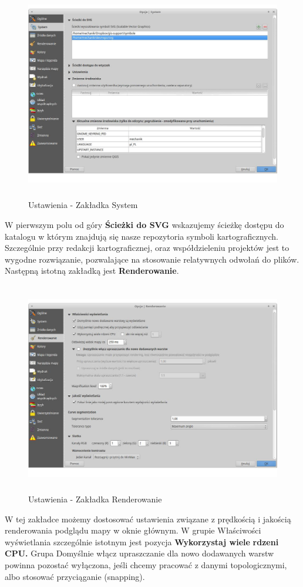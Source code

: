 \documentclass[12pt,a4paper]{book}
\begin{document}
\begin{center}
\begin{figure}
\includegraphics[width=13.014cm,height=9.282cm]{002-zakladka-system.png}
\caption{Ustawienia - Zakładka System}
\end{figure}
\end{center}
W pierwszym polu od góry \textbf{Ścieżki do SVG }wskazujemy ścieżkę dostępu do katalogu w którym znajdują się nasze repozytoria symboli kartograficznych. Szczególnie przy redakcji kartograficznej, oraz współdzieleniu projektów jest to wygodne rozwiązanie, pozwalające na stosowanie relatywnych odwołań do plików. Następną istotną zakładką jest \textbf{Renderowanie}.

\begin{center}
\begin{figure}
\includegraphics[width=13.014cm,height=9.275cm]{002-zakladka-renderowanie.jpg}
\caption{Ustawienia - Zakładka Renderowanie}
\end{figure}
\end{center}
W tej zakładce możemy dostosować ustawienia związane z prędkością i jakością renderowania podglądu mapy w oknie głównym. W grupie Właściwości wyświetlania szczególnie istotnym jest pozycja \textbf{Wykorzystaj wiele} \textbf{rdzeni CPU.} Grupa Domyślnie włącz upraszczanie dla nowo dodawanych warstw powinna pozostać wyłączona, jeśli chcemy pracować z danymi topologicznymi, albo stosować przyciąganie (snapping).
\end{document}

